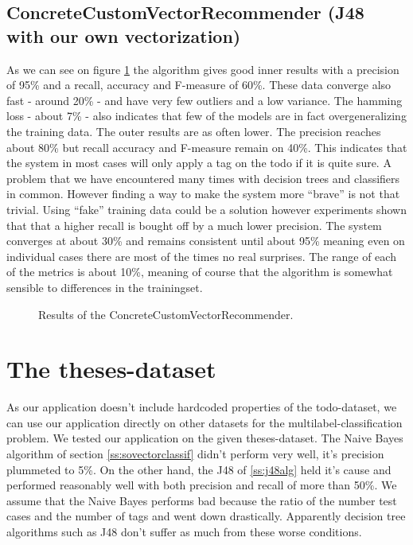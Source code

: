\documentclass[a4paper,titlepage]{article}
\begin{document}
\subsection{ConcreteCustomVectorRecommender (J48 with our own vectorization)}
As we can see on figure \ref{fig:ccvrresults} the algorithm gives good inner results with a precision of 95\% and a recall, accuracy and F-measure of 60\%. These data converge also fast - around 20\% - and have very few outliers and a low variance. The hamming loss - about 7\% - also indicates that few of the models are in fact overgeneralizing the training data. The outer results are as often lower. The precision reaches about 80\% but recall accuracy and F-measure remain on 40\%. This indicates that the system in most cases will only apply a tag on the todo if it is quite sure. A problem that we have encountered many times with decision trees and classifiers in common. However finding a way to make the system more ``brave'' is not that trivial. Using ``fake'' training data could be a solution however experiments shown that that a higher recall is bought off by a much lower precision. The system converges at about 30\% and remains consistent until about 95\% meaning even on individual cases there are most of the times no real surprises. The range of each of the metrics is about 10\%, meaning of course that the algorithm is somewhat sensible to differences in the trainingset.
\begin{figure}
\centering
{}
\caption{Results of the ConcreteCustomVectorRecommender.}
\label{fig:ccvrresults}
\end{figure}
\section{The theses-dataset}
As our application doesn't include hardcoded properties of the todo-dataset, we can use our application directly on other datasets for the multilabel-classification problem. We tested our application on the given theses-dataset. The Naive Bayes algorithm of section \ref{ss:sovectorclassif} didn't perform very well, it's precision plummeted to 5\%. On the other hand, the J48 of \ref{ss:j48alg} held it's cause and performed reasonably well with both precision and recall of more than 50\%. 
We assume that the Naive Bayes performs bad because the ratio of  the number test cases  and the number of tags and went down drastically. Apparently decision tree algorithms such as J48 don't suffer as much from these worse conditions. 
\end{document}
